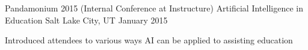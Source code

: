 \begin{cventries}
  \cventry
    {Pandamonium 2015 (Internal Conference at Instructure)}
    {Artificial Intelligence in Education}
    {Salt Lake City, UT}
    {January 2015}
    {
      \begin{cvitems}
        \item {Introduced attendees to various ways AI can be applied to assisting education}
      \end{cvitems}
    }
\end{cventries}
